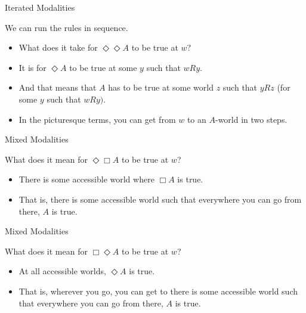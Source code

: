 \documentclass[
  ignorenonframetext,
]{beamer}
\providecommand{\tightlist}{%
  \setlength{\itemsep}{0pt}\setlength{\parskip}{0pt}}
\renewcommand{\,}{\text{, }}
\begin{document}
\begin{frame}{Iterated Modalities}
\protect\hypertarget{iterated-modalities-1}{}

We can run the rules in sequence.\pause

\begin{itemize}
\tightlist
\item
  What does it take for \(\Diamond \Diamond A\) to be true at \(w\)?
  \pause
\item
  It is for \(\Diamond A\) to be true at some \(y\) such that
  \(wRy\).\pause
\item
  And that means that \(A\) has to be true at some world \(z\) such that
  \(yRz\) (for some \(y\) such that \(wRy)\).\pause
\item
  In the picturesque terms, you can get from \(w\) to an \(A\)-world in
  two steps.
\end{itemize}

\end{frame}

\begin{frame}{Mixed Modalities}
\protect\hypertarget{mixed-modalities}{}

What does it mean for \(\Diamond \Box A\) to be true at \(w\)?\pause

\begin{itemize}
\tightlist
\item
  There is some accessible world where \(\Box A\) is true.\pause
\item
  That is, there is some accessible world such that everywhere you can
  go from there, \(A\) is true.
\end{itemize}

\end{frame}

\begin{frame}{Mixed Modalities}
\protect\hypertarget{mixed-modalities-1}{}

What does it mean for \(\Box \Diamond A\) to be true at \(w\)?\pause

\begin{itemize}
\tightlist
\item
  At all accessible worlds, \(\Diamond A\) is true.\pause
\item
  That is, wherever you go, you can get to there is some accessible
  world such that everywhere you can go from there, \(A\) is true.
\end{itemize}

\end{frame}
\end{document}
